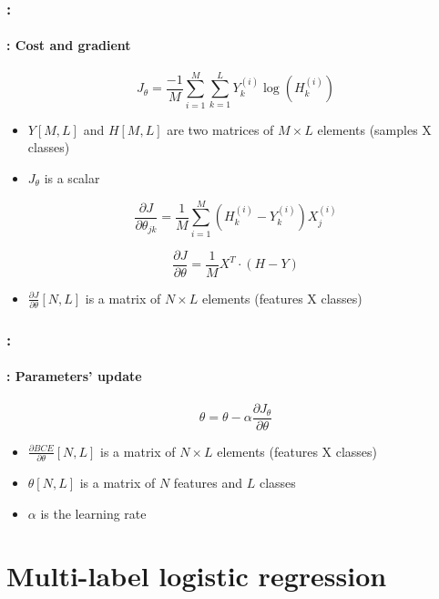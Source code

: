 \documentclass[xcolor=table]{beamer}
\begin{document}
\begin{frame}
	\frametitle{\insertshortsubtitle: \insertsection}
	\framesubtitle{\insertsubsection: Cost and gradient}
	
	\[J_\theta = \frac{-1}{M} \sum\limits_{i=1}^{M} \sum_{k=1}^{L} Y^{(i)}_k \log(H^{(i)}_k)\]
	\begin{itemize}
		\item $Y[M, L]$ and $H[M, L]$ are two matrices of $M\times L$ elements (samples X classes)
		\item $J_\theta$ is a scalar
	\end{itemize}
	
	\[
	\frac{\partial J}{\partial \theta_{jk}} = \frac{1}{M} \sum\limits_{i=1}^{M} (H^{(i)}_k - Y^{(i)}_k) X_j^{(i)}
	\]
	
	\[
	\frac{\partial J}{\partial \theta} = \frac{1}{M} X^T \cdot (H - Y)
	\]
	
	\begin{itemize}
		\item $\frac{\partial J}{\partial \theta}[N, L]$ is a matrix of $N\times L$ elements (features X classes)
	\end{itemize}
	
\end{frame}

\begin{frame}
	\frametitle{\insertshortsubtitle: \insertsection}
	\framesubtitle{\insertsubsection: Parameters' update}
	
	\[\theta = \theta - \alpha \frac{\partial J_\theta}{\partial \theta}\]
	
	\begin{itemize}
		\item $\frac{\partial BCE}{\partial \theta}[N, L]$ is a matrix of $N\times L$ elements (features X classes)
		\item $\theta[N, L]$ is a matrix of $N$ features and $L$ classes
		\item $\alpha$ is the learning rate
	\end{itemize}
	
\end{frame}

\section{Multi-label logistic regression}

\begin{frame}
	\frametitle{\insertshortsubtitle}
	\framesubtitle{\insertsection}
	
	\begin{center}
		 \hskip1cm
	\end{center}
	
\end{frame}
\end{document}
